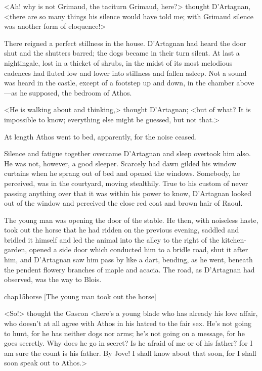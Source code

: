 <Ah! why is not Grimaud, the taciturn Grimaud, here?> thought D'Artagnan, <there are so many things his silence would have told me; with Grimaud silence was another form of eloquence!>

There reigned a perfect stillness in the house. D'Artagnan had heard the door shut and the shutters barred; the dogs became in their turn silent. At last a nightingale, lost in a thicket of shrubs, in the midst of its most melodious cadences had fluted low and lower into stillness and fallen asleep. Not a sound was heard in the castle, except of a footstep up and down, in the chamber above—as he supposed, the bedroom of Athos.

<He is walking about and thinking,> thought D'Artagnan; <but of what? It is impossible to know; everything else might be guessed, but not that.>

At length Athos went to bed, apparently, for the noise ceased.

Silence and fatigue together overcame D'Artagnan and sleep overtook him also. He was not, however, a good sleeper. Scarcely had dawn gilded his window curtains when he sprang out of bed and opened the windows. Somebody, he perceived, was in the courtyard, moving stealthily. True to his custom of never passing anything over that it was within his power to know, D'Artagnan looked out of the window and perceived the close red coat and brown hair of Raoul.

The young man was opening the door of the stable. He then, with noiseless haste, took out the horse that he had ridden on the previous evening, saddled and bridled it himself and led the animal into the alley to the right of the kitchen-garden, opened a side door which conducted him to a bridle road, shut it after him, and D'Artagnan saw him pass by like a dart, bending, as he went, beneath the pendent flowery branches of maple and acacia. The road, as D'Artagnan had observed, was the way to Blois.

\begin{bwbigpic}
	[\basicscale] 
	{chap15horse}
	[The young man took out the horse]
\end{bwbigpic}

<So!> thought the Gascon <here's a young blade who has already his love affair, who doesn't at all agree with Athos in his hatred to the fair sex. He's not going to hunt, for he has neither dogs nor arms; he's not going on a message, for he goes secretly. Why does he go in secret? Is he afraid of me or of his father? for I am sure the count is his father. By Jove! I shall know about that soon, for I shall soon speak out to Athos.>

